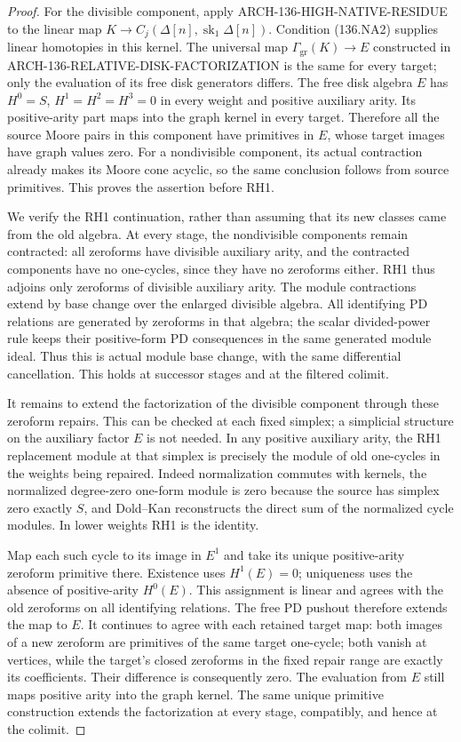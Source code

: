 \begin{proof}
For the divisible component, apply
ARCH-136-HIGH-NATIVE-RESIDUE to the linear map
\(K\to C_j(\Delta[n],\operatorname{sk}_1\Delta[n])\).
Condition (136.NA2) supplies linear homotopies in this kernel.
The universal map \(\Gamma_{\mathrm{gr}}(K)\to E\)
constructed in ARCH-136-RELATIVE-DISK-FACTORIZATION is the
same for every target; only the evaluation of its free disk
generators differs. The free disk algebra \(E\) has
\(H^0=S\), \(H^1=H^2=H^3=0\) in every weight and
positive auxiliary arity. Its positive-arity part maps into
the graph kernel in every target. Therefore all the source
Moore pairs in this component have primitives in \(E\),
whose target images have graph values zero. For a nondivisible
component, its actual contraction already makes its Moore
cone acyclic, so the same conclusion follows from source
primitives. This proves the assertion before RH1.

We verify the RH1 continuation, rather than assuming that
its new classes came from the old algebra. At every stage,
the nondivisible components remain contracted: all zeroforms
have divisible auxiliary arity, and the contracted components
have no one-cycles, since they have no zeroforms either.
RH1 thus adjoins only zeroforms of divisible auxiliary arity.
The module contractions extend by base change over the
enlarged divisible algebra. All identifying PD relations are
generated by zeroforms in that algebra; the scalar divided-power
rule keeps their positive-form PD consequences in the same
generated module ideal. Thus this is actual module base change,
with the same differential
cancellation. This holds at successor stages and at the
filtered colimit.

It remains to extend the factorization of the divisible
component through these zeroform repairs. This can be checked
at each fixed simplex; a simplicial structure on the auxiliary
factor \(E\) is not needed. In any positive auxiliary arity,
the RH1 replacement module at that simplex is precisely the
module of old one-cycles in the weights being repaired.
Indeed normalization commutes with kernels, the normalized
degree-zero one-form module is zero because the source has
simplex zero exactly \(S\), and Dold--Kan reconstructs the
direct sum of the normalized cycle modules. In lower weights
RH1 is the identity.

Map each such cycle to its image in \(E^1\) and take its
unique positive-arity zeroform primitive there. Existence uses
\(H^1(E)=0\); uniqueness uses the absence of positive-arity
\(H^0(E)\). This assignment is linear and agrees with the
old zeroforms on all identifying relations. The free PD
pushout therefore extends the map to \(E\). It continues
to agree with each retained target map: both images of a new
zeroform are primitives of the same target one-cycle; both
vanish at vertices, while the target's closed zeroforms in
the fixed repair range are exactly its coefficients. Their
difference is consequently zero. The evaluation from \(E\)
still maps positive arity into the graph kernel. The same
unique primitive construction extends the factorization at
every stage, compatibly, and hence at the colimit.


\end{proof}
